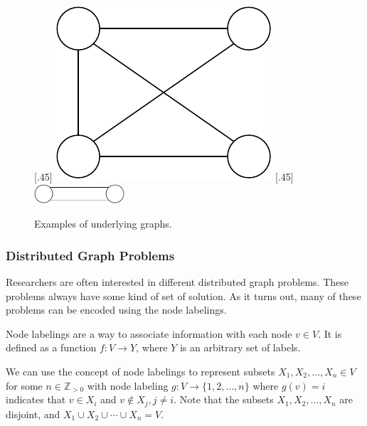 \begin{figure}[H]
    [.45\linewidth] {
    \centering
    \includegraphics[scale=0.6]{diagrams/formalizing_pn_network_underlying_graph_1.pdf}
  }
  \hfill
    [.45\linewidth] {
    \centering
    \includegraphics[width=0.3\textwidth]{diagrams/formalizing_pn_network_underlying_graph_2.pdf}
  }
  \caption{Examples of underlying graphs.}
  \label{fig:underlying_graphs1}
\end{figure}

\subsubsection{Distributed Graph Problems} \label{sec:dist_graph_probl}
Researchers are often interested in different distributed graph problems.
These problems always have some kind of set of solution.
As it turns out, many of these problems can be encoded using the node labelings.

Node labelings are a way to associate information with each node $v \in V$.
It is defined as a function $f\colon V \rightarrow Y$, where $Y$ is an arbitrary set of labels.

We can use the concept of node labelings to represent subsets $X_1, X_2, \dotsc, X_n \in V$ for some $n \in \mathbb{Z}_{>0}$ with node labeling $g\colon V \rightarrow \{1, 2, \dotsc, n\}$ where $g(v) = i$ indicates that $v \in X_i$ and $v \notin X_j, j \neq i$.
Note that the subsets $X_1, X_2, \dotsc, X_n$  are disjoint, and $X_1 \cup X_2 \cup \dotsb \cup X_n = V$.

